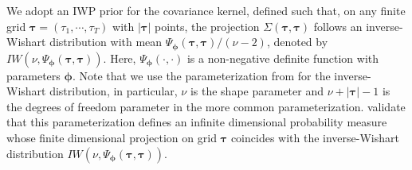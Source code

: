 We adopt an IWP prior for the covariance kernel, defined such that, on any finite 
grid $\boldsymbol{\tau}=(\tau_1,\cdots,\tau_T)$ with $|\boldsymbol{\tau}|$ points, 
the projection $\Sigma(\boldsymbol{\tau},\boldsymbol{\tau})$ follows an inverse-Wishart 
distribution with mean 
$\Psi_{\boldsymbol{\phi}}(\boldsymbol{\tau},\boldsymbol{\tau}) / (\nu-2)$, denoted by 
$IW(\nu,\Psi_{\boldsymbol{\phi}}(\boldsymbol{\tau},\boldsymbol{\tau}))$.
Here, $\Psi_{\boldsymbol{\phi}}(\cdot,\cdot)$ is a non-negative definite function 
with parameters $\boldsymbol{\phi}$. Note that we use the parameterization from 
\citet{Dawid1981} for the inverse-Wishart distribution, in particular, $\nu$ is the 
shape parameter and $\nu+|\boldsymbol{\tau}|-1$ is the degrees of freedom parameter in the
more common parameterization. \citet{Yang2016} validate that this parameterization defines 
an infinite dimensional probability measure whose finite dimensional projection on grid 
$\boldsymbol{\tau}$ coincides with the inverse-Wishart distribution 
$IW(\nu,\Psi_{\boldsymbol{\phi}}(\boldsymbol{\tau},\boldsymbol{\tau}))$.  


